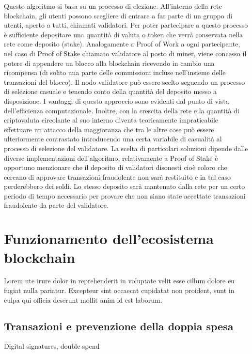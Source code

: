 Questo algoritmo si basa su un processo di elezione. All’interno della rete blockchain, gli utenti possono scegliere di entrare a far parte di un gruppo di utenti, aperto a tutti, chiamati validatori. Per poter partecipare a questo processo è sufficiente depositare una quantità di valuta o token che verrà conservata nella rete come deposito (stake). Analogamente a Proof of Work a ogni partecipante, nel caso di Proof of Stake chiamato validatore al posto di miner, viene concesso il potere di appendere un blocco alla blockchain ricevendo in cambio una ricompensa (di solito una parte delle commissioni incluse nell’insieme delle transazioni del blocco). Il nodo validatore può essere scelto seguendo un processo di selezione casuale e tenendo conto della quantità del deposito messo a disposizione. I vantaggi di questo approccio sono evidenti dal punto di vista dell’efficienza computazionale. Inoltre, con la crescita della rete e la quantità di criptovaluta circolante al suo interno diventa teoricamente impraticabile effettuare un attacco della maggioranza che tra le altre cose può essere ulteriormente contrastato introducendo una certa variabile di casualità al processo di selezione del validatore. La scelta di particolari soluzioni dipende dalle diverse implementazioni dell'algoritmo, relativamente a Proof of Stake è opportuno menzionare che il deposito di validatori disonesti cioè coloro che cercano di approvare transazioni fraudolente non sarà restituito e in tal caso perderebbero dei soldi. Lo stesso deposito sarà mantenuto dalla rete per un certo periodo di tempo necessario per provare che non siano state accettate transazioni fraudolente da parte del validatore.


\section{Funzionamento dell'ecosistema blockchain} %

Lorem ute irure dolor in reprehenderit in voluptate velit esse cillum dolore eu fugiat nulla pariatur. Excepteur sint occaecat cupidatat non proident, sunt in culpa qui officia deserunt mollit anim id est laborum.

\subsection{Transazioni e prevenzione della doppia spesa}


Digital signatures, double spend

